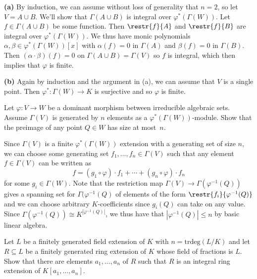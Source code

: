 \documentclass[11pt,letterpaper]{article}
\begin{document}
\begin{solution}
    \textbf{(a)} By induction, we can assume without loss of generality that $n=2$, so let $V=A\cup B$. We'll show that $\Gamma(A\cup B)$ is integral over $\varphi^*(\Gamma(W))$. Let $f\in \Gamma(A\cup B)$ be some function. Then $\restr{f}{A}$ and $\restr{f}{B}$ are integral over $\varphi^*(\Gamma(W))$. We thus have monic polynomials $\alpha,\beta\in \varphi^*(\Gamma(W))[x]$ with $\alpha(f)=0$ in $\Gamma(A)$ and $\beta(f)=0$ in $\Gamma(B)$. Then $(\alpha\cdot\beta)(f)=0$ on $\Gamma(A\cup B)=\Gamma(V)$ so $f$ is integral, which then implies that $\varphi$ is finite.
    
    \textbf{(b)} Again by induction and the argument in (a), we can assume that $V$ is a single point. Then $\varphi^* : \Gamma(W) \to K$ is surjective and so $\varphi$ is finite. 
\end{solution}
    
\begin{problem}
    Let $\varphi:V\rightarrow W$ be a dominant morphism between irreducible algebraic sets. Assume $\Gamma(V)$ is generated by $n$ elements as a $\varphi^*(\Gamma(W))$-module. Show that the preimage of any point $Q\in W$ has size at most~$n$.
\end{problem}

\begin{solution}
    Since $\Gamma(V)$ is a finite $\varphi^*(\Gamma(W))$ extension with a generating set of size $n$, we can choose some generating set $f_1,\ldots, f_n\in \Gamma(V)$ such that any element $f\in \Gamma(V)$ can be written as
    \[
        f = (g_1\circ \varphi)\cdot f_1+\cdots + (g_n\circ \varphi)\cdot f_n
    \] 
    for some $g_i \in \Gamma(W)$. Note that the restriction map $\Gamma(V) \to \Gamma(\varphi^{-1}(Q))$ gives a spanning set for $\Gamma(\varphi^{-1}(Q)$ of elements of the form $\restr{f_i}{\varphi^{-1}(Q)}$ and we can choose arbitrary $K$-coefficients since $g_i(Q)$ can take on any value. Since $\Gamma(\varphi^{-1}(Q))\cong K^{|\varphi^{-1}(Q)|}$, we thus have that $|\varphi^{-1}(Q)|\leq n$ by basic linear algebra.
\end{solution}
    
\begin{problem}
    Let $L$ be a finitely generated field extension of $K$ with $n=\textrm{trdeg}(L/K)$ and let $R\subseteq L$ be a finitely generated ring extension of $K$ whose field of fractions is $L$. Show that there are elements $a_1,\dots,a_n$ of $R$ such that $R$ is an integral ring extension of $K[a_1,\dots,a_n]$.
\end{problem}
    
\end{document}
